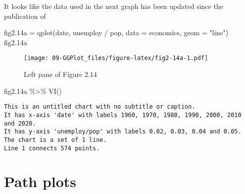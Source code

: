 \documentclass[
]{book}
\newenvironment{Shaded}{\begin{snugshade}}{\end{snugshade}}
\newcommand{\AttributeTok}[1]{\textcolor[rgb]{0.77,0.63,0.00}{#1}}
\newcommand{\CommentTok}[1]{\textcolor[rgb]{0.56,0.35,0.01}{\textit{#1}}}
\newcommand{\ControlFlowTok}[1]{\textcolor[rgb]{0.13,0.29,0.53}{\textbf{#1}}}
\newcommand{\DecValTok}[1]{\textcolor[rgb]{0.00,0.00,0.81}{#1}}
\newcommand{\FloatTok}[1]{\textcolor[rgb]{0.00,0.00,0.81}{#1}}
\newcommand{\FunctionTok}[1]{\textcolor[rgb]{0.00,0.00,0.00}{#1}}
\newcommand{\NormalTok}[1]{#1}
\newcommand{\OtherTok}[1]{\textcolor[rgb]{0.56,0.35,0.01}{#1}}
\newcommand{\SpecialCharTok}[1]{\textcolor[rgb]{0.00,0.00,0.00}{#1}}
\newcommand{\StringTok}[1]{\textcolor[rgb]{0.31,0.60,0.02}{#1}}
\begin{document}
It looks like the data used in the next graph has been updated since the publication of \citet{Wickham2009ggplot2}

\begin{Shaded}
\begin{Highlighting}[]
\NormalTok{fig2}\FloatTok{.14}\NormalTok{a }\OtherTok{=} \FunctionTok{qplot}\NormalTok{(date, unemploy }\SpecialCharTok{/}\NormalTok{ pop, }\AttributeTok{data =}\NormalTok{ economics, }\AttributeTok{geom =} \StringTok{"line"}\NormalTok{)    }
\NormalTok{fig2}\FloatTok{.14}\NormalTok{a}
\end{Highlighting}
\end{Shaded}

\begin{figure}
\centering
\texttt{[image: 09-GGPlot\_files/figure-latex/fig2-14a-1.pdf]}
\caption{\label{fig:fig2-14a}Left pane of Figure 2.14}
\end{figure}

\begin{Shaded}
\begin{Highlighting}[]
\NormalTok{fig2}\FloatTok{.14}\NormalTok{a }\SpecialCharTok{\%\textgreater{}\%} \FunctionTok{VI}\NormalTok{()   }
\end{Highlighting}
\end{Shaded}

\begin{verbatim}
This is an untitled chart with no subtitle or caption.
It has x-axis 'date' with labels 1960, 1970, 1980, 1990, 2000, 2010 and 2020.
It has y-axis 'unemploy/pop' with labels 0.02, 0.03, 0.04 and 0.05.
The chart is a set of 1 line.
Line 1 connects 574 points.
\end{verbatim}

\hypertarget{path-plots}{%
\section{Path plots}\label{path-plots}}

\begin{Shaded}
\end{Shaded}
\end{document}
